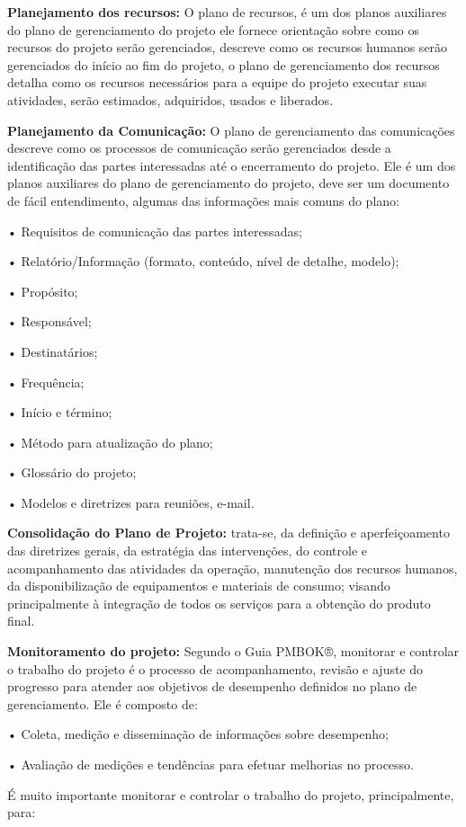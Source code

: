 \documentclass[	DIV=calc,%
							paper=a4,%
							fontsize=12pt,%
							onecolumn]{scrartcl}	 					%
\begin{document}
{\textbf{Planejamento dos recursos:}} O plano de recursos, é um dos planos auxiliares do plano de gerenciamento do projeto ele fornece orientação sobre como os recursos do projeto serão gerenciados, descreve como os recursos humanos serão gerenciados do início ao fim do projeto, o plano de gerenciamento dos recursos detalha como os recursos necessários para a equipe do projeto executar suas atividades, serão estimados, adquiridos, usados e liberados.


{\textbf{Planejamento da Comunicação:}} O plano de gerenciamento das comunicações descreve como os processos de comunicação serão gerenciados desde a identificação das partes interessadas até o encerramento do projeto.
Ele é um dos planos auxiliares do plano de gerenciamento do projeto, deve ser um documento de fácil entendimento, algumas das informações mais comuns do plano:

•	Requisitos de comunicação das partes interessadas;

•	Relatório/Informação (formato, conteúdo, nível de detalhe, modelo);

•	Propósito;

•	Responsável;

•	Destinatários;

•	Frequência;

•	Início e término;

•	Método para atualização do plano;

•	Glossário do projeto;

•	Modelos e diretrizes para reuniões, e-mail.


{\textbf{Consolidação do Plano de Projeto:}} trata-se, da definição e aperfeiçoamento das diretrizes gerais, da estratégia das intervenções, do controle e acompanhamento das atividades da operação, manutenção dos recursos humanos, da disponibilização de equipamentos e materiais de consumo; visando principalmente à integração de todos os serviços para a obtenção do produto final.

{\textbf{Monitoramento do projeto:}} Segundo o Guia PMBOK®, monitorar e controlar o trabalho do projeto é o processo de acompanhamento, revisão e ajuste do progresso para atender aos objetivos de desempenho definidos no plano de gerenciamento.
Ele é composto de:

•	Coleta, medição e disseminação de informações sobre desempenho;

•	Avaliação de medições e tendências para efetuar melhorias no processo.


É muito importante monitorar e controlar o trabalho do projeto, principalmente, para:
\end{document}
